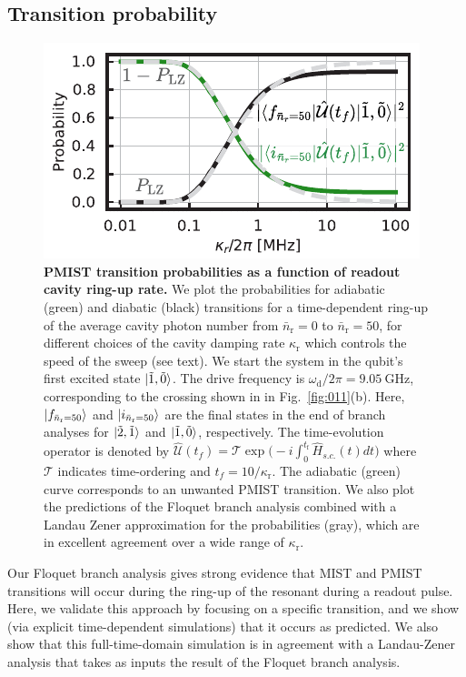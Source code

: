 \documentclass[%
reprint,
superscriptaddress,
 amsmath,amssymb,
 aps,
 prx,
longbibliography,
floatfix,
]{revtex4-2}
\begin{document}
\subsection{Transition probability}\label{sec:LZ}
\begin{figure}[t]
    \centering
    \includegraphics[width=\linewidth]{Figures/LZ.pdf}
    \caption{
    {\bf PMIST transition probabilities as a function of readout cavity ring-up rate.}
    We plot the probabilities for adiabatic (green) and diabatic (black) transitions for a time-dependent ring-up of the average cavity photon number from $\bar{n}_\textrm{r} = 0$ to $\bar{n}_\textrm{r} = 50$, for different choices of the cavity damping rate $\kappa_\textrm{r}$ which controls the speed of the sweep (see text).  We start the system in the qubit's first excited state $\ket{\tilde{1},\tilde{0}}$.  The drive frequency is $\omega_\textrm{d}/2\pi=9.05 \ \mathrm{GHz}$, corresponding to the crossing shown in in Fig.~\ref{fig:011}(b).
    Here, $\ket{f_{\bar n_\textrm{r}=50}}$ and $\ket{i_{\bar n_\textrm{r}=50}}$ are the final states in the end of branch analyses for $\ket{\tilde{2},\tilde{1}}$ and $\ket{\tilde{1},\tilde{0}}$, respectively. The time-evolution operator is denoted by $ \hat{\mathcal{U}}(t_f)=\mathcal{T}\exp\big(-i\int^{t_\mathrm{f}}_{0} \hat H_{s.c.}(t)dt\big)$ where $\mathcal{T}$ indicates time-ordering and $t_f=10/\kappa_\textrm{r}$. The adiabatic (green) curve corresponds to an unwanted PMIST transition.  We also plot the predictions of the Floquet branch analysis combined with a Landau Zener approximation for the probabilities (gray), which are in excellent agreement over a wide range of $\kappa_\textrm{r}$.}
    \label{fig:LZ}
\end{figure}

Our Floquet branch analysis gives strong evidence that MIST and PMIST transitions will occur during the ring-up of the resonant during a readout pulse.  Here, we validate this approach by focusing on a specific transition, and we show (via explicit time-dependent simulations) that it occurs as predicted.  We also show that this full-time-domain simulation is in agreement with a Landau-Zener analysis that takes as inputs the result of the Floquet branch analysis.    
\end{document}
